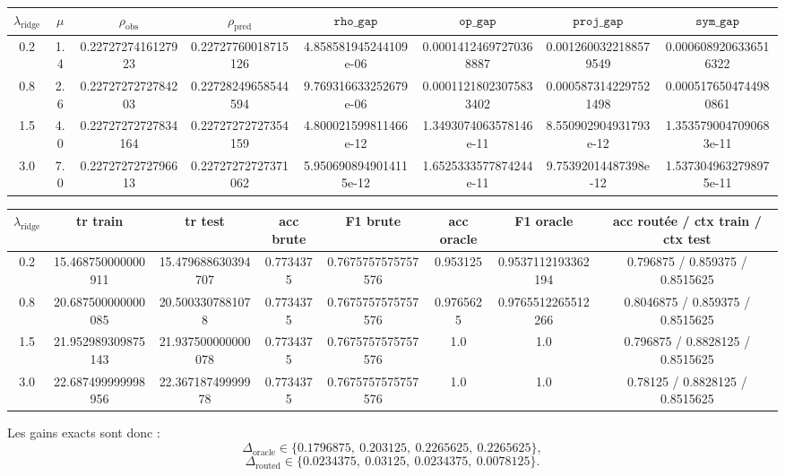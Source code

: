 \begin{center}
\small
\begin{tabular}{c c c c c c c c}
\hline
\(\lambda_{\mathrm{ridge}}\) & \(\mu\) & \(\rho_{\mathrm{obs}}\) & \(\rho_{\mathrm{pred}}\) & \(\texttt{rho\_gap}\) & \(\texttt{op\_gap}\) & \(\texttt{proj\_gap}\) & \(\texttt{sym\_gap}\) \\
\hline
0.2 & 1.4 & 0.2272727416127923 & 0.22727760018715126 & 4.858581945244109e-06 & 0.00014124697270368887 & 0.0012600322188579549 & 0.0006089206336516322 \\
0.8 & 2.6 & 0.2272727272784203 & 0.22728249658544594 & 9.769316633252679e-06 & 0.00011218023075833402 & 0.0005873142297521498 & 0.0005176504744980861 \\
1.5 & 4.0 & 0.22727272727834164 & 0.22727272727354159 & 4.800021599811466e-12 & 1.3493074063578146e-11 & 8.550902904931793e-12 & 1.3535790047090683e-11 \\
3.0 & 7.0 & 0.2272727272796613 & 0.22727272727371062 & 5.9506908949014115e-12 & 1.6525333577874244e-11 & 9.75392014487398e-12 & 1.5373049632798975e-11 \\
\hline
\end{tabular}
\end{center}

\begin{center}
\small
\begin{tabular}{c c c c c c c c}
\hline
\(\lambda_{\mathrm{ridge}}\) & tr train & tr test & acc brute & F1 brute & acc oracle & F1 oracle & acc routée / ctx train / ctx test \\
\hline
0.2 & 15.468750000000911 & 15.479688630394707 & 0.7734375 & 0.7675757575757576 & 0.953125 & 0.9537112193362194 & 0.796875 / 0.859375 / 0.8515625 \\
0.8 & 20.687500000000085 & 20.5003307881078 & 0.7734375 & 0.7675757575757576 & 0.9765625 & 0.9765512265512266 & 0.8046875 / 0.859375 / 0.8515625 \\
1.5 & 21.952989309875143 & 21.937500000000078 & 0.7734375 & 0.7675757575757576 & 1.0 & 1.0 & 0.796875 / 0.8828125 / 0.8515625 \\
3.0 & 22.687499999998956 & 22.36718749999978 & 0.7734375 & 0.7675757575757576 & 1.0 & 1.0 & 0.78125 / 0.8828125 / 0.8515625 \\
\hline
\end{tabular}
\end{center}

Les gains exacts sont donc :
\[
\Delta_{\mathrm{oracle}} \in \{0.1796875,\ 0.203125,\ 0.2265625,\ 0.2265625\},
\]
\[
\Delta_{\mathrm{routed}} \in \{0.0234375,\ 0.03125,\ 0.0234375,\ 0.0078125\}.
\]

